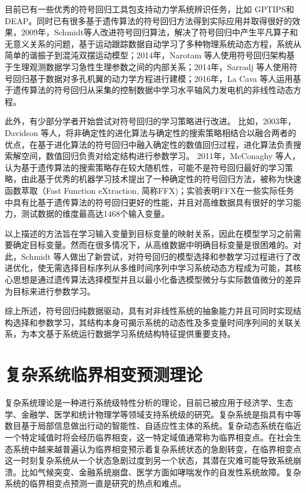 目前已有一些优秀的符号回归工具包支持动力学系统辨识任务，比如 GPTIPS\cite{searson2010gptips}和 DEAP\cite{fortin2012deap}。同时已有很多基于遗传算法的符号回归方法得到实际应用并取得很好的效果，2009年，Schmidt等人改进符号回归算法，解决了符号回归中产生平凡算子和无意义关系的问题，基于运动跟踪数据自动学习了多种物理系统动态方程，系统从简单的谐振子到混沌双摆运动模型\cite{schmidt2009distilling}；2014年，Narotam 等人使用符号回归架构基于生理观测数据学习急性生理参数之间的内部关系\cite{narotam2014physiological}；2014年，Sarradj 等人使用符号回归基于数据对多孔机翼的动力学方程进行建模\cite{sarradj2014symbolic}；2016年，La Cava 等人运用基于遗传算法的符号回归从采集的控制数据中学习水平轴风力发电机的非线性动态方程\cite{la2016automatic}。

此外，有少部分学者开始尝试对符号回归的学习策略进行改进。
比如，2003年，Davidson 等人，将非确定性的进化算法与确定性的搜索策略相结合以融合两者的优点，在基于进化算法的符号回归中融入确定性的数值回归过程，进化算法负责搜索解空间，数值回归负责对给定结构进行参数学习\cite{davidson2003symbolic}。
2011年，McConaghy 等人\cite{mcconaghy2011ffx}，认为基于遗传算法的搜索策略存在较大随机性，可能不是符号回归最好的学习策略，由此基于优秀的机器学习技术提出了一种确定性的符号回归方法，被称为快速函数萃取（Fast Function eXtraction, 简称FFX)；实验表明FFX在一些实际任务中具有比基于遗传算法的符号回归更好的性能，并且对高维数据具有很好的学习能力，测试数据的维度最高达1468个输入变量。

以上描述的方法旨在学习输入变量到目标变量的映射关系，因此在模型学习之前需要确定目标变量。然而在很多情况下，从高维数据中明确目标变量是很困难的。对此，Schmidt 等人做出了新尝试\cite{schmidt2009distilling}，对符号回归的模型选择和参数学习过程进行了改进优化，使无需选择目标序列从多维时间序列中学习系统动态方程成为可能，其核心思想是通过遗传算法选择模型并且以最小化备选模型微分与实际数值微分的差异为目标来进行参数学习。

综上所述，符号回归纯数据驱动，具有对非线性系统的抽象能力并且可同时实现结构选择和参数学习，其结构本身可揭示系统的动态性及多变量时间序列间的关联关系，为本文基于系统运行数据学习{\heiti 系统结构特征}提供重要支持。

\section{复杂系统临界相变预测理论}
\label{sec:csd-theory}

复杂系统理论是一种进行系统级特性分析的理论，目前已被应用于经济学、生态学、金融学、医学和统计物理学等领域支持系统级的研究\cite{auyang1999foundations}。复杂系统是指具有中等数目基于局部信息做出行动的智能性、自适应性主体的系统。复杂动态系统在临近一个特定域值时将会经历临界相变\cite{ladyman2013complex}，这一特定域值通常称为临界相变点。在社会生态系统中越来越普遍认为临界相变预示着复杂系统状态的急剧转变，在临界相变点这一时刻复杂系统从一个状态急剧过度到另一个状态，其潜在灾难可能导致系统崩溃\cite{scheffer2009critical,scheffer2012anticipating}。比如气候突变\cite{dakos2008slowing}、金融系统崩盘\cite{battiston2016complexity}、医学方面如哮喘发作的自发性系统故障\cite{litt2001epileptic}。复杂系统的临界相变点预测一直是研究的热点和难点。


